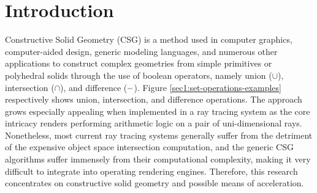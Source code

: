 \documentclass[a4paper,11pt,oneside]{article}
\newcommand{\minus}{\scalebox{0.9}[1.0]{$-$}} %
\begin{document}
\newpage
\tableofcontents

\clearpage
{}

\section{Introduction}
  
Constructive Solid Geometry (CSG) is a method used in computer graphics, computer-aided design, generic modeling languages, and numerous other applications to construct complex geometries from simple primitives or polyhedral solids through the use of boolean operators, namely union ($\cup$),  intersection ($\cap$), and difference ($\minus$). Figure \ref{sec1:set-operations-examples} respectively shows union, intersection, and difference operations. The approach grows especially appealing when implemented in a ray tracing system as the core intricacy renders performing arithmetic logic on a pair of uni-dimensional rays. Nonetheless, most current ray tracing systems generally suffer from the detriment of the expensive object space intersection computation, and the generic CSG algorithms suffer immensely from their computational complexity, making it very difficult to integrate into operating rendering engines. Therefore, this research concentrates on constructive solid geometry and possible means of acceleration.
  
\end{document}
